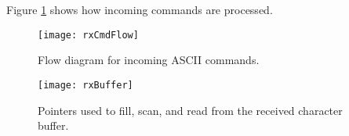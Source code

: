 Figure \ref{fig:rxCmdFlow} shows how incoming commands are processed.
\begin{figure}[ht]
    \begin{center}
        \texttt{[image: rxCmdFlow]}
        \caption{Flow diagram for incoming ASCII commands.\label{fig:rxCmdFlow}}
    \end{center}
\end{figure}


\begin{figure}[ht]
    \begin{center}
        \texttt{[image: rxBuffer]}
        \caption{Pointers used to fill, scan, and read from the received character buffer.\label{fig:rxBuffer}}
    \end{center}
\end{figure}


